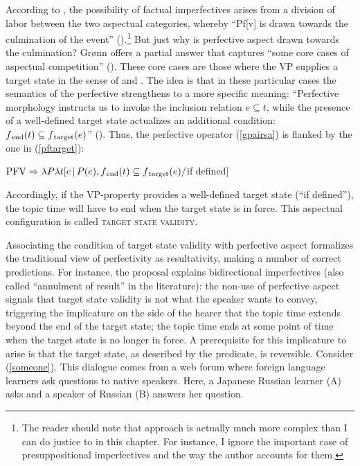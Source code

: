 \documentclass[output=paper,colorlinks,citecolor=brown]{langscibook}
\begin{document}
According to \citet{Gronn2004}, the possibility of factual imperfectives arises from a division of labor between the two aspectual categories, whereby ``Pf[v] is drawn towards the culmination of the event'' (\citealt[61]{Gronn2004}).\footnote{The reader should note that  approach is actually much more complex than I can do justice to in this chapter. For instance, I ignore the important case of presuppositional imperfectives and the way the author accounts for them.} 
But just why is perfective aspect drawn towards the culmination? Gr{\o}nn offers a partial answer that captures ``some core cases of aspectual competition'' (\citealt[234]{Gronn2004}). These core cases are those where the VP supplies a target state in the sense of \citet{Parsons1990} and \citet{Kratzer2000}. The idea is that in these particular cases the semantics of the perfective strengthens to a more specific meaning: ``Perfective morphology instructs us to invoke the inclusion relation $e \subseteq t$, while the presence of a well-defined target state actualizes an additional condition: $f\textsubscript{end}(t) \subseteq f\textsubscript{target}(e)$'' (\citealt[234]{Gronn2004}). 
Thus, the perfective operator (\ref{gpairsa}) is flanked by the one in (\ref{pftarget}):

\ea\label{pftarget}
$\text{PFV} \Rightarrow \lambda P \lambda t [e \,|\, P(e), f\textsubscript{end}(t) \subseteq f\textsubscript{target}(e) /$if defined$]$ 
\z

\noindent Accordingly, if the VP-property provides a well-defined target state (``if defined''), the topic time will have to end when the target state is in force. This aspectual configuration is called \textsc{target state validity}. 

Associating the condition of target state validity with perfective aspect formalizes the traditional view of perfectivity as resultativity, making a number of correct predictions. 
For instance, the proposal explains bidirectional imperfectives (also called ``annulment of result'' in the literature): the non-use of perfective aspect signals that target state validity is not what the speaker wants to convey, triggering the implicature on the side of the hearer that the topic time extends beyond the end of the target state; the topic time ends at some point of time when the target state is no longer in force. A prerequisite for this implicature to arise is that the target state, as described by the predicate, is reversible. Consider (\ref{someone}). 
This dialogue comes from a web forum where foreign language learners ask questions to native speakers. Here, a Japanese Russian learner (A) asks and a speaker of Russian (B) answers her question.    
\end{document}
